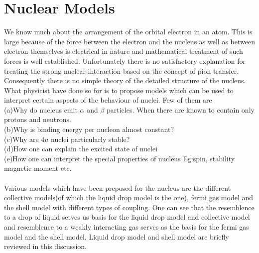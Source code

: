 \section{Nuclear Models}
We know much about the arrangement of the orbital electron in an atom. This is large because of the force between the electron and the nucleus as well as between electron themselves is electrical in nature and mathematical treatment of such forces is well established. Unfortunately there is no satisfactory explanation for treating the strong nuclear interaction based on the concept of pion transfer. Consequently there is no simple theory of the detailed structure of the nucleus.\\
What physicist have done so for is to propose models which can be used to interpret certain aspects of the behaviour of nuclei. Few of them are\\
(a)\quad Why do nucleus emit $\alpha$ and $\beta$ particles. When there are known to contain only protons and neutrons. \\
(b)\quad Why is binding energy per nucleon almost constant? \\
(c)\quad Why are $4u$ nuclei particularly stable?\\
(d)\quad How one can explain the excited state of nuclei\\
(e)\quad How one can interpret the special properties of nucleus 
Eg:\quad spin, stability magnetic moment etc.\\\\
Various models which have been preposed for the nucleus are the different collective models(of which the liquid drop model is the one), fermi gas model and the shell model with different types of coupling. One can see that the resemblence to a drop of liquid setves us basis for the liquid drop model and collective model and resemblence to a weakly interacting gas serves as the basis for the fermi gas model and the shell model. Liquid drop model and shell model are briefly reviewed in this discussion.  \\
